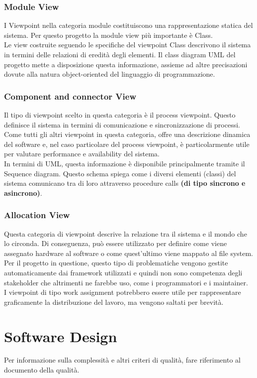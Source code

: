 \documentclass{article}
\begin{document}
\subsubsection{Module View}
I Viewpoint nella categoria module costituiscono una rappresentazione statica del sistema. Per questo progetto la module view più importante è Class. 
\\Le view costruite seguendo le specifiche del viewpoint Class descrivono il sistema in termini delle relazioni di eredità degli elementi. Il class diagram UML del progetto mette a disposizione questa informazione, assieme ad altre precisazioni dovute alla natura object-oriented del linguaggio di programmazione. 
\subsubsection{Component and connector View}
Il tipo di viewpoint scelto in questa categoria è il process viewpoint. Questo definisce il sistema in termini di comunicazione e sincronizzazione di processi. 
\\Come tutti gli altri viewpoint in questa categoria, offre una descrizione dinamica del software e, nel caso particolare del process viewpoint, è particolarmente utile per valutare performance e availability del sistema. 
\\In termini di UML, questa informazione è disponibile principalmente tramite il Sequence diagram. Questo schema spiega come i diversi elementi (classi) del sistema comunicano tra di loro attraverso procedure calls \textbf{(di tipo sincrono e asincrono)}.
\subsubsection{Allocation View}
Questa categoria di viewpoint descrive la relazione tra il sistema e il mondo che lo circonda. Di conseguenza, può essere utilizzato per definire come viene assegnato hardware al software o come quest’ultimo viene mappato al file system. 
\\Per il progetto in questione, questo tipo di problematiche vengono gestite automaticamente dai framework utilizzati e quindi non sono competenza degli stakeholder che altrimenti ne farebbe uso, come i programmatori e i maintainer.
\\I viewpoint di tipo work assignment potrebbero essere utile per rappresentare graficamente la distribuzione del lavoro, ma vengono saltati per brevità. 
\newpage
\section{Software Design}
Per informazione sulla complessità e altri criteri di qualità, fare riferimento al documento della qualità.
\end{document}
